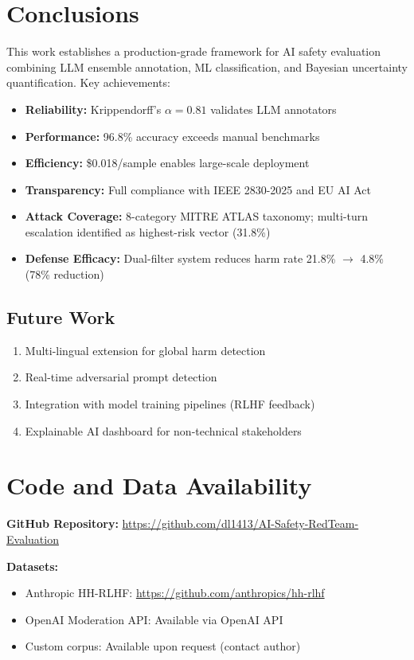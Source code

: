 \documentclass[11pt,a4paper]{article}
\begin{document}
\section{Conclusions}

This work establishes a production-grade framework for AI safety evaluation combining LLM ensemble annotation, ML classification, and Bayesian uncertainty quantification. Key achievements:

\begin{itemize}
    \item \textbf{Reliability:} Krippendorff's $\alpha = 0.81$ validates LLM annotators
    \item \textbf{Performance:} 96.8\% accuracy exceeds manual benchmarks
    \item \textbf{Efficiency:} \$0.018/sample enables large-scale deployment
    \item \textbf{Transparency:} Full compliance with IEEE 2830-2025 and EU AI Act
    \item \textbf{Attack Coverage:} 8-category MITRE ATLAS taxonomy; multi-turn escalation identified as highest-risk vector (31.8\%)
    \item \textbf{Defense Efficacy:} Dual-filter system reduces harm rate 21.8\% $\to$ 4.8\% (78\% reduction)
\end{itemize}

\subsection{Future Work}
\begin{enumerate}
    \item Multi-lingual extension for global harm detection
    \item Real-time adversarial prompt detection
    \item Integration with model training pipelines (RLHF feedback)
    \item Explainable AI dashboard for non-technical stakeholders
\end{enumerate}

\section*{Code and Data Availability}

\textbf{GitHub Repository:} \url{https://github.com/dl1413/AI-Safety-RedTeam-Evaluation}

\textbf{Datasets:}
\begin{itemize}
    \item Anthropic HH-RLHF: \url{https://github.com/anthropics/hh-rlhf}
    \item OpenAI Moderation API: Available via OpenAI API
    \item Custom corpus: Available upon request (contact author)
\end{itemize}
\end{document}
